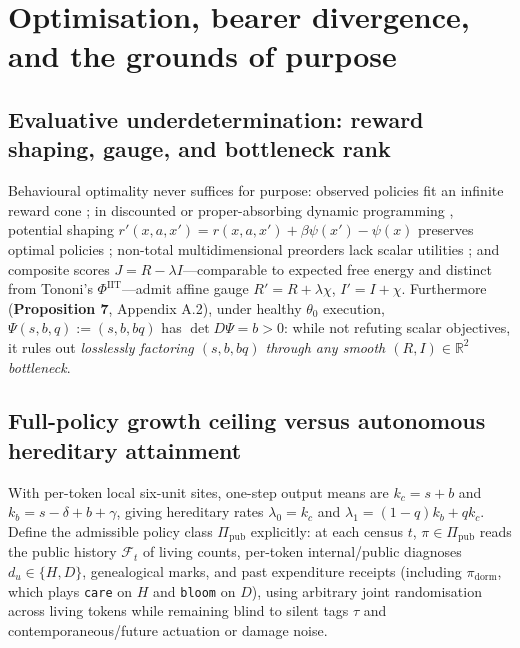 \documentclass[12pt,letterpaper]{article}
\begin{document}
\section{Optimisation, bearer divergence, and the grounds of
purpose}\label{optimisation-bearer-divergence-and-the-grounds-of-purpose}

\subsection{Evaluative underdetermination: reward shaping, gauge, and
bottleneck
rank}\label{evaluative-underdetermination-reward-shaping-gauge-and-bottleneck-rank}

Behavioural optimality never suffices for purpose: observed policies fit
an infinite reward cone \citep[§3.1]{ngRussell2000}; in discounted or
proper-absorbing dynamic programming
\citep{blackwell1965, puterman1994}, potential shaping
\(r'(x,a,x') = r(x,a,x') + \beta\psi(x') - \psi(x)\) preserves optimal
policies \citep{ngHaradaRussell1999}; non-total multidimensional
preorders lack scalar utilities \citep{krantz1971}; and composite scores
\(J = R - \lambda I\)---comparable to expected free energy
\citep{parrPezzuloFriston2022} and distinct from Tononi's
\citeyearpar{tononi2004} \(\Phi^{\mathrm{IIT}}\)---admit affine gauge
\(R' = R + \lambda\chi\), \(I' = I + \chi\). Furthermore
(\textbf{Proposition 7}, Appendix A.2), under healthy \(\theta_0\)
execution, \(\Psi(s,b,q) := (s, b, bq)\) has \(\det D\Psi = b > 0\):
while not refuting scalar objectives, it rules out \emph{losslessly
factoring \((s,b,bq)\) through any smooth \((R,I) \in \mathbb{R}^2\)
bottleneck}.

\subsection{Full-policy growth ceiling versus autonomous hereditary
attainment}\label{full-policy-growth-ceiling-versus-autonomous-hereditary-attainment}

With per-token local six-unit sites, one-step output means are
\(k_c = s+b\) and \(k_b = s-\delta+b+\gamma\), giving hereditary rates
\(\lambda_0 = k_c\) and \(\lambda_1 = (1-q)k_b + q k_c\). Define the
admissible policy class \(\Pi_{\mathrm{pub}}\) explicitly: at each
census \(t\), \(\pi \in \Pi_{\mathrm{pub}}\) reads the public history
\(\mathcal{F}_t\) of living counts, per-token internal/public diagnoses
\(d_u \in \{H, D\}\), genealogical marks, and past expenditure receipts
(including \(\pi_{\mathrm{dorm}}\), which plays \texttt{care} on \(H\)
and \texttt{bloom} on \(D\)), using arbitrary joint randomisation across
living tokens while remaining blind to silent tags \(\tau\) and
contemporaneous/future actuation or damage noise.
\end{document}
